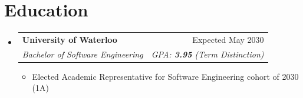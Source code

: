 \documentclass[letterpaper,11pt]{article}
\makeatletter
\newcommand{\resumeItem}[1]{
  \item\small{
    {#1 \vspace{-2pt}}
  }
}
\newcommand{\resumeSubheading}[4]{
  \vspace{-2pt}\item
    \begin{tabular*}{0.97\textwidth}[t]{l@{\extracolsep{\fill}}r}
      \textbf{#1} & #2 \\
      \textit{\small#3} & \textit{\small #4} \\
    \end{tabular*}\vspace{-7pt}
}
\newcommand{\resumeSubHeadingListStart}{\begin{itemize}[leftmargin=0.15in, label={}]}
\newcommand{\resumeSubHeadingListEnd}{\end{itemize}}
\newcommand{\resumeItemListStart}{\begin{itemize}}
\newcommand{\resumeItemListEnd}{\end{itemize}\vspace{-5pt}}
\makeatother
\begin{document}
\section{Education}
  \resumeSubHeadingListStart
    \resumeSubheading
      {University of Waterloo}{Expected May 2030}
      {Bachelor of Software Engineering}{GPA: \textbf{3.95} (Term Distinction)}
      \resumeItemListStart
        \resumeItem{Elected Academic Representative for Software Engineering cohort of 2030 (1A)}
      \resumeItemListEnd
  \resumeSubHeadingListEnd


\end{document}
